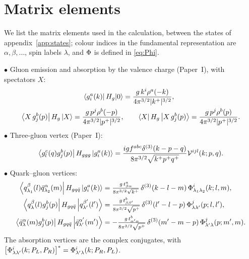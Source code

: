 \section{Matrix elements}
\label{app:me}

We list the matrix elements used in the calculation, between the states of
appendix~\ref{app:states}; colour indices in the fundamental representation are $\alpha,\beta,\dots$,
spin labels $\lambda$, and $\Phi$ is defined in \eqref{eq:Phi}.

\noindent$\bullet$ Gluon emission and absorption by the valence charge (Paper~I), with spectators $X$:
{\small\begin{align}
\left\langle g^{a}_{i}(k)\right|H_{g}|0\rangle&=\frac{g\,k^{i}\rho^{a}(-k)}{4\pi^{3/2}|k^{+}|^{3/2}},
\label{eq:MEg}\\
\left\langle X\,g^{b}_{j}(p)\right|H_{g}\left|X\right\rangle=\frac{g\,p^{j}\rho^{b}(-p)}{4\pi^{3/2}|p^{+}|^{3/2}},&\qquad
\left\langle X\right|H_{g}\left|X\,g^{b}_{j}(p)\right\rangle=\frac{g\,p^{j}\rho^{b}(p)}{4\pi^{3/2}|p^{+}|^{3/2}} .
\label{eq:MEg2}
\end{align}}
$\bullet$ Three-gluon vertex (Paper~I):
{\small\begin{equation}
\left\langle g^{c}_{l}(q)g^{b}_{j}(p)\right|H_{ggg}\left|g^{a}_{i}(k)\right\rangle=
\frac{igf^{abc}\delta^{(3)}(k-p-q)}{8\pi^{3/2}\sqrt{k^{+}p^{+}q^{+}}}\mathcal{V}^{ijl}(k;p,q).
\label{eq:MEggg}
\end{equation}}
$\bullet$ Quark--gluon vertices:
{\small\begin{align}
\left\langle q^{\beta}_{\lambda_{1}}(l)\bar q^{\alpha}_{\lambda_{2}}(m)\right|H_{gq\bar q}\left|g^{a}_{i}(k)\right\rangle&=
\tfrac{g\,t^{a}_{\beta\alpha}}{8\pi^{3/2}\sqrt{k^{+}}}\,\delta^{(3)}(k-l-m)\,\Phi^{i}_{\lambda_{1}\lambda_{2}}(k;l,m),
\label{eq:MEqqg}\\
\left\langle q^{\beta}_{\lambda}(l)g^{b}_{j}(p)\right|H_{gq\bar q}\left|q^{\beta'}_{\lambda'}(l')\right\rangle&=
\tfrac{g\,t^{b}_{\beta\beta'}}{8\pi^{3/2}\sqrt{p^{+}}}\,\delta^{(3)}(l'-l-p)\,\Phi^{j}_{\lambda\lambda'}(p;l,l'),
\label{eq:MEqg}\\
\left\langle\bar q^{\alpha}_{\lambda}(m)g^{b}_{j}(p)\right|H_{gq\bar q}\left|\bar q^{\alpha'}_{\lambda'}(m')\right\rangle&=
-\tfrac{g\,t^{b}_{\alpha'\alpha}}{8\pi^{3/2}\sqrt{p^{+}}}\,\delta^{(3)}(m'-m-p)\,\Phi^{j}_{\lambda'\lambda}(p;m',m).
\label{eq:MEaqg}
\end{align}}
The absorption vertices are the complex conjugates, with
$\big[\Phi^{i}_{\lambda\lambda'}(k;P_{L},P_{R})\big]^{*}=\Phi^{i}_{\lambda'\lambda}(k;P_{R},P_{L})$.


